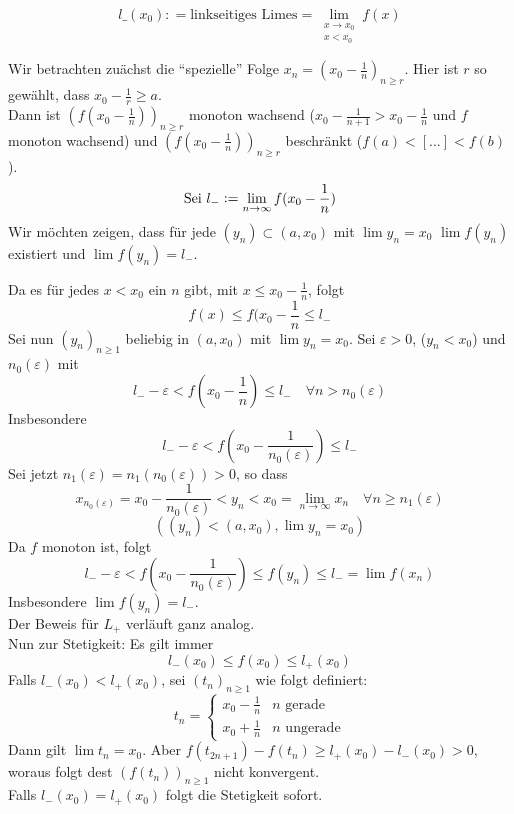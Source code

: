 \[l\_\left( {{x_0}} \right): = {\text{linkseitiges Limes}} = \mathop {\lim }\limits_{\begin{array}{*{20}{c}}
{x \to {x_0}}\\
{x < {x_0}}
\end{array}} f(x)\]
\begin{center}
\end{center}
\noindent Wir betrachten zuächst die ``spezielle'' Folge $x_{n}=(x_{0}-\frac{1}{n})_{n\geq r}$. Hier ist $r$ so gewählt, dass $x_{0}-\frac{1}{r}\geq a$. \\
Dann ist $(f(x_{0}-\frac{1}{n}))_{n\geq r}$ monoton wachsend ($x_{0}-\frac{1}{n+1} > x_{0}-\frac{1}{n}$ und $f$ monoton wachsend) und $(f(x_{0}-\frac{1}{n}))_{n\geq r}$ beschränkt ($f(a)<[...]<f(b)$).
\[\text{Sei }l_{-}\vcentcolon=\lim_{n\to\infty}{f(x_{0}-\frac{1}{n})}\]
\noindent Wir möchten zeigen, dass für jede $(y_{n})\subset (a, x_{0})$ mit $\lim{y_{n}}=x_{0}$ $\lim{f(y_{n})}$ existiert und $\lim{f(y_{n})}=l_{-}$. 

Da es für jedes $x<x_{0}$ ein $n$ gibt, mit $x\leq x_{0}-\frac{1}{n}$, folgt \[f(x) \leq f(x_{0}-\frac{1}{n} \leq l_{-}\]
Sei nun $(y_{n})_{n\geq 1}$ beliebig in $(a, x_{0})$ mit $\lim{y_{n}}=x_{0}$. Sei $\varepsilon > 0$, ($y_{n} < x_{0}$) und $n_{0}(\varepsilon)$ mit \[l_{-}-\varepsilon < f(x_{0}-\frac{1}{n})\leq l_{-} \quad \forall n>n_{0}(\varepsilon) \]
Insbesondere
\[l_{-} - \varepsilon < f(x_{0}-\frac{1}{n_{0}(\varepsilon)}) \leq l_{-} \]
Sei jetzt $n_{1}(\varepsilon)=n_{1}(n_{0}(\varepsilon))>0$, so dass \[ x_{n_{0}(\varepsilon)} = x_{0} - \frac{1}{n_{0}(\varepsilon)} < y_{n} < x_{0} = \lim_{n\to\infty}{x_{n}} \quad \forall n \geq n_{1}(\varepsilon)\]
\[ \left((y_{n})<(a,x_{0}), \lim{y_{n}}=x_{0}\right)\]
Da $f$ monoton ist, folgt \[ l_{-} - \varepsilon < f(x_{0}-\frac{1}{n_{0}(\varepsilon)}) \leq f(y_{n}) \leq l_{-} = \lim{f(x_{n})} \]
Insbesondere $\lim{f(y_{n})} = l_{-}$. \\

\noindent Der Beweis für $L_{+}$ verläuft ganz analog. \\

\noindent Nun zur Stetigkeit: Es gilt immer \[ l_{-}(x_{0})\leq f(x_{0}) \leq l_{+}(x_{0}) \]
Falls $l_{-}(x_{0}) < l_{+}(x_{0})$, sei $(t_{n})_{n \geq 1}$ wie folgt definiert:
\[ t_{n}=\begin{cases}x_{0}-\frac{1}{n} &n\text{ gerade} \\ x_{0}+\frac{1}{n} &n\text{ ungerade} \end{cases} \]
Dann gilt $\lim{t_{n}} = x_{0}$. Aber $f(t_{2n+1})-f(t_{n}) \geq l_{+}(x_{0})-l_{-}(x_{0}) >0$, woraus folgt dest  $(f(t_{n}))_{n\geq1}$ nicht konvergent. \\
Falls $l_{-}(x_{0})=l_{+}(x_{0})$ folgt die Stetigkeit sofort.


